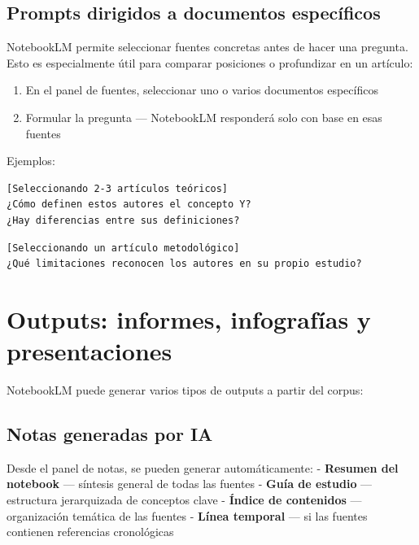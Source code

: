 \documentclass[
]{book}
\providecommand{\tightlist}{%
  \setlength{\itemsep}{0pt}\setlength{\parskip}{0pt}}
\begin{document}
\subsection{Prompts dirigidos a documentos específicos}\label{prompts-dirigidos-a-documentos-especuxedficos}

NotebookLM permite seleccionar fuentes concretas antes de hacer una pregunta. Esto es especialmente útil para comparar posiciones o profundizar en un artículo:

\begin{enumerate}
\def\labelenumi{\arabic{enumi}.}
\tightlist
\item
  En el panel de fuentes, seleccionar uno o varios documentos específicos
\item
  Formular la pregunta --- NotebookLM responderá solo con base en esas fuentes
\end{enumerate}

Ejemplos:

\begin{verbatim}
[Seleccionando 2-3 artículos teóricos]
¿Cómo definen estos autores el concepto Y?
¿Hay diferencias entre sus definiciones?
\end{verbatim}

\begin{verbatim}
[Seleccionando un artículo metodológico]
¿Qué limitaciones reconocen los autores en su propio estudio?
\end{verbatim}

\section{Outputs: informes, infografías y presentaciones}\label{outputs-informes-infografuxedas-y-presentaciones}

NotebookLM puede generar varios tipos de outputs a partir del corpus:

\subsection{Notas generadas por IA}\label{notas-generadas-por-ia}

Desde el panel de notas, se pueden generar automáticamente: - \textbf{Resumen del notebook} --- síntesis general de todas las fuentes - \textbf{Guía de estudio} --- estructura jerarquizada de conceptos clave - \textbf{Índice de contenidos} --- organización temática de las fuentes - \textbf{Línea temporal} --- si las fuentes contienen referencias cronológicas
\end{document}
